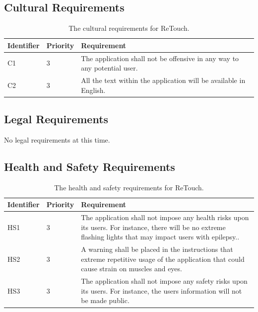 \documentclass[12pt, titlepage]{article}
\begin{document}
\subsection{Cultural Requirements}

\begin{table}[H]
  \caption{The cultural requirements for ReTouch.}
\begin{tabular}{ |m{2cm}|m{1.8cm}|m{9.4cm}| }
    \hline
    \textbf{Identifier} & \textbf{Priority} & \textbf{Requirement} \\ 
    \hline
    C1 & 3 & The application shall not be offensive in any way to any potential user.\\
    \hline
    C2 & 3 & All the text within the application will be available in English. \\
    \hline
\end{tabular}
\end{table}

\subsection{Legal Requirements}

No legal requirements at this time.

\subsection{Health and Safety Requirements}

\begin{table}[H]
  \caption{The health and safety requirements for ReTouch.}
\begin{tabular}{ |m{2cm}|m{1.8cm}|m{9.4cm}| }
    \hline
    \textbf{Identifier} & \textbf{Priority} & \textbf{Requirement} \\ 
    \hline
    HS1 & 3 & The application shall not impose any health risks upon its users. For instance, there will be no extreme flashing lights that may impact users with epilepsy.. \\
    \hline
     HS2 & 3 & A warning shall be placed in the instructions that extreme repetitive usage of the application that could cause strain on muscles and eyes. \\
    \hline
    HS3 & 3 & The application shall not impose any safety risks upon its users. For instance, the users information will not be made public. \\
    \hline
\end{tabular}
\end{table}
\end{document}
